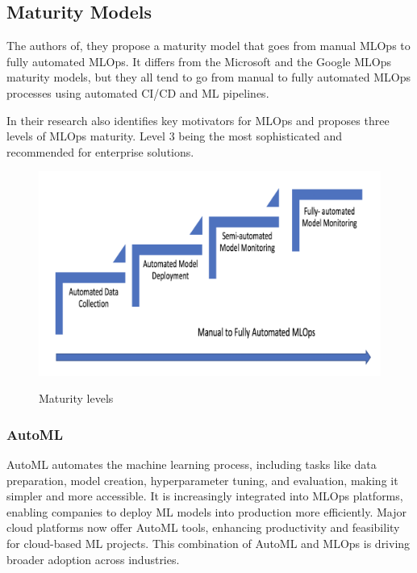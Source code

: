 \subsection{Maturity Models}\label{subsec:matutiry-models}
The authors of\cite{mlops-maturity-model}, they propose a maturity model that goes from manual MLOps to fully automated MLOps.
It differs from the Microsoft and the Google MLOps maturity models,
but they all tend to go from manual to fully automated MLOps processes using automated CI/CD and
ML pipelines.\cite{mlops-definition-tools-and-challenge}

In their research\cite{inproceedings} also identifies key motivators for MLOps and proposes three levels of MLOps maturity.
Level 3 being the most sophisticated and recommended for enterprise solutions.

\begin{figure}[!htbp]
    \caption{Maturity levels \cite{mlops-maturity-model}}
    \centering
    \includegraphics[scale=0.5]{images/maturity-levels}
    \label{fig:maturity}
\end{figure}

\subsubsection{AutoML}

AutoML automates the machine learning process, including tasks like data preparation, model creation, hyperparameter tuning, and evaluation,
making it simpler and more accessible.
It is increasingly integrated into MLOps platforms, enabling companies to deploy ML models into production more efficiently.
Major cloud platforms now offer AutoML tools, enhancing productivity and feasibility for cloud-based ML projects.
This combination of AutoML and MLOps is driving broader adoption across industries.\cite{gift2021practical,mlops-definition-tools-and-challenge}

